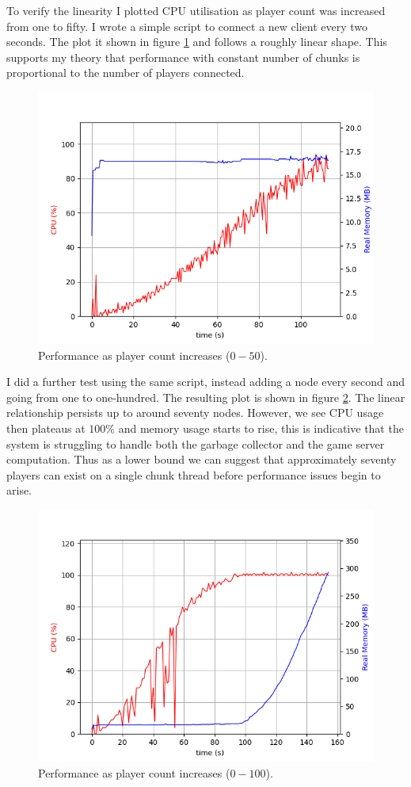 \documentclass[12pt,notitlepage,a4paper]{report}
\begin{document}
	To verify the linearity I plotted CPU utilisation as player count was increased from one to fifty. I wrote a simple script to connect a new client every two seconds. The plot it shown in figure \ref{fig:linear50} and follows a roughly linear shape. This supports my theory that performance with constant number of chunks is proportional to the number of players connected.
	\begin{figure}
		\includegraphics[width=\textwidth]{linear.png}
		\caption{Performance as player count increases ($0-50$).}
		\label{fig:linear50}
	\end{figure}

	I did a further test using the same script, instead adding a node every second and going from one to one-hundred. The resulting plot is shown in figure \ref{fig:linear100}. The linear relationship persists up to around seventy nodes. However, we see CPU usage then plateaus at $100\%$ and memory usage starts to rise, this is indicative that the system is struggling to handle both the garbage collector and the game server computation. Thus as a lower bound we can suggest that approximately seventy players can exist on a single chunk thread before performance issues begin to arise.
	\begin{figure}
		\includegraphics[width=\textwidth]{linear100.png}
		\caption{Performance as player count increases ($0-100$).}
		\label{fig:linear100}
	\end{figure}
\end{document}

